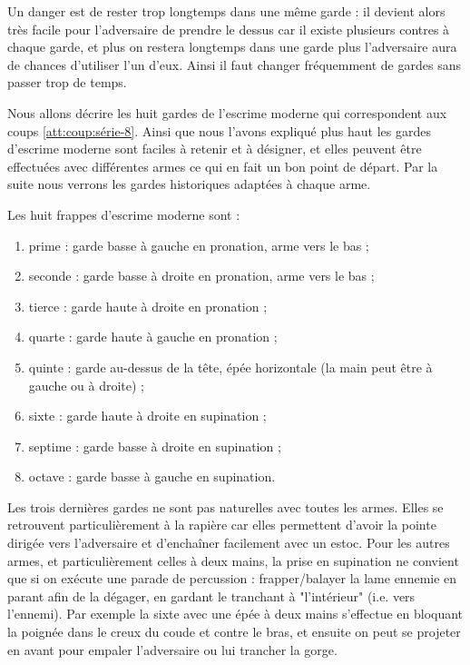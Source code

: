Un danger est de rester trop longtemps dans une même garde : il devient alors très facile pour l'adversaire de prendre le dessus car il existe plusieurs contres à chaque garde, et plus on restera longtemps dans une garde plus l'adversaire aura de chances d'utiliser l'un d'eux.
Ainsi il faut changer fréquemment de gardes sans passer trop de temps.

Nous allons décrire les huit gardes de l'escrime moderne qui correspondent aux coups \ref{att:coup:série-8}.
Ainsi que nous l'avons expliqué plus haut les gardes d'escrime moderne sont faciles à retenir et à désigner, et elles peuvent être effectuées avec différentes armes ce qui en fait un bon point de départ.
Par la suite nous verrons les gardes historiques adaptées à chaque arme.


\begin{garde}
	\label{att:garde:escrime-moderne}

	\noindent
	Les huit frappes d'escrime moderne sont :
	\begin{enumerate}
		\item prime : garde basse à gauche en pronation, arme vers le bas ;
		\item seconde : garde basse à droite en pronation, arme vers le bas ;
		\item tierce : garde haute à droite en pronation ;
		\item quarte : garde haute à gauche en pronation ;
		\item quinte : garde au-dessus de la tête, épée horizontale (la main peut être à gauche ou à droite) ;
		\item sixte : garde haute à droite en supination ;
		\item septime : garde basse à droite en supination ;
		\item octave : garde basse à gauche en supination.
	\end{enumerate}
\end{garde}


Les trois dernières gardes ne sont pas naturelles avec toutes les armes.
Elles se retrouvent particulièrement à la rapière car elles permettent d'avoir la pointe dirigée vers l'adversaire et d'enchaîner facilement avec un estoc.
Pour les autres armes, et particulièrement celles à deux mains, la prise en supination ne convient que si on exécute une parade de percussion : frapper/balayer la lame ennemie en parant afin de la dégager, en gardant le tranchant à "l'intérieur" (i.e. vers l'ennemi).
Par exemple la sixte avec une épée à deux mains s'effectue en bloquant la poignée dans le creux du coude et contre le bras, et ensuite on peut se projeter en avant pour empaler l'adversaire ou lui trancher la gorge.

